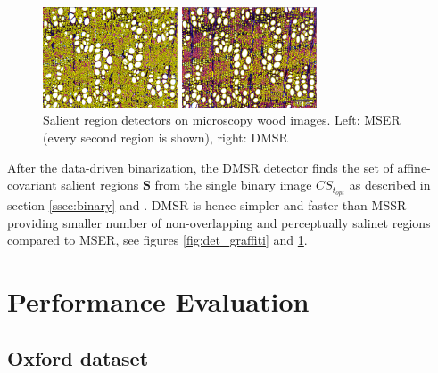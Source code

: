\documentclass{article}
\def\S{{\mathbf S}}
\begin{document}
\begin{figure}[htb]

\begin{minipage}[b]{.49\linewidth}
  \centering
  \centerline{\includegraphics[width=4.0cm]{./Figs/mserWood}}
\end{minipage}
\hfill
\begin{minipage}[b]{0.49\linewidth}
  \centering
  \centerline{\includegraphics[width=4.0cm]{./Figs/dmsrWood}}
\end{minipage}
\vspace{-0.25cm}
\caption{Salient region detectors on microscopy wood images. Left: MSER (every second region is shown), right: DMSR}
\label{fig:wood}
%
\end{figure}
After the data-driven binarization, the DMSR detector finds the set of affine-covariant salient regions $\S$ from the single binary image $CS_{t_{opt}}$ as described in section \ref{ssec:binary} and \cite{RangMSSR06, RangHumpb06}. DMSR is hence simpler and faster than MSSR providing smaller number of non-overlapping and perceptually salinet regions compared to MSER, see figures \ref{fig:det_graffiti} and \ref{fig:wood}.


\section{Performance  Evaluation}
\label{sec:perf}

\subsection{Oxford dataset}
\label{ssec:oxford}
\end{document}
